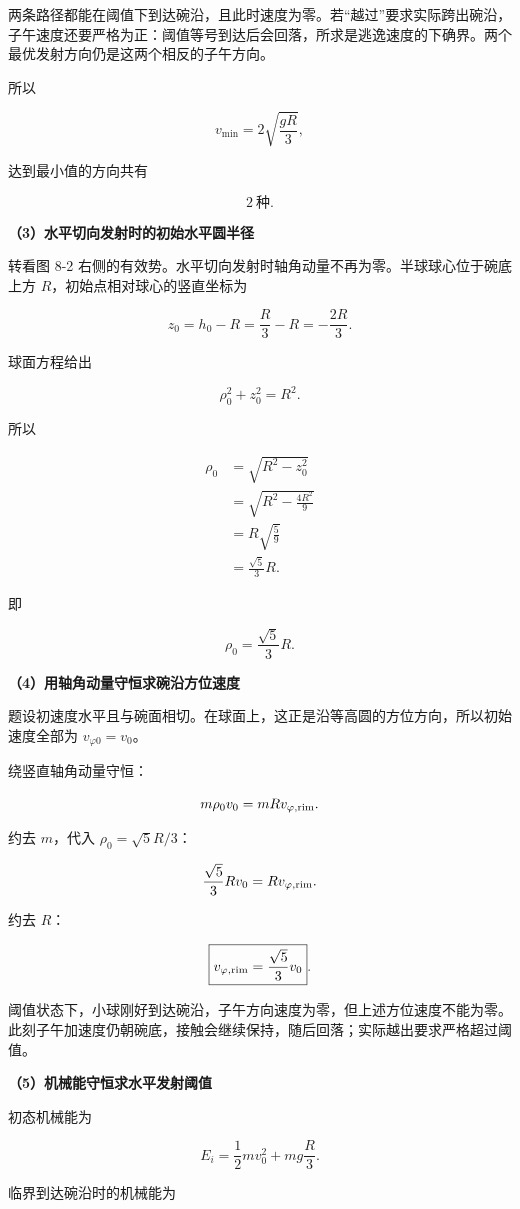 \documentclass[12pt,a4paper,UTF8]{ctexart}
\begin{document}
两条路径都能在阈值下到达碗沿，且此时速度为零。若``越过''要求实际跨出碗沿，子午速度还要严格为正：阈值等号到达后会回落，所求是逃逸速度的下确界。两个最优发射方向仍是这两个相反的子午方向。

所以

\[
\boxed{v_{\min}=2\sqrt{\frac{gR}{3}}},
\]

达到最小值的方向共有

\[\boxed{2\ \text{种}}.\]

\textbf{（3）水平切向发射时的初始水平圆半径}

转看图 8-2
右侧的有效势。水平切向发射时轴角动量不再为零。半球球心位于碗底上方
\(R\)，初始点相对球心的竖直坐标为

\[
z_0=h_0-R
=\frac R3-R
=-\frac{2R}{3}.
\]

球面方程给出

\[
\rho_0^2+z_0^2=R^2.
\]

所以

\[
\begin{aligned}
\rho_0
&=\sqrt{R^2-z_0^2}\\
&=\sqrt{R^2-\frac{4R^2}{9}}\\
&=R\sqrt{\frac59}\\
&=\frac{\sqrt5}{3}R.
\end{aligned}
\]

即

\[\boxed{\rho_0=\frac{\sqrt5}{3}R}.\]

\textbf{（4）用轴角动量守恒求碗沿方位速度}

题设初速度水平且与碗面相切。在球面上，这正是沿等高圆的方位方向，所以初始速度全部为
\(v_{\varphi0}=v_0\)。

绕竖直轴角动量守恒：

\[
m\rho_0v_0=mRv_{\varphi,\rm rim}.
\]

约去 \(m\)，代入 \(\rho_0=\sqrt5R/3\)：

\[
\frac{\sqrt5}{3}Rv_0
=Rv_{\varphi,\rm rim}.
\]

约去 \(R\)：

\[
\boxed{
v_{\varphi,\rm rim}=\frac{\sqrt5}{3}v_0
}.
\]

阈值状态下，小球刚好到达碗沿，子午方向速度为零，但上述方位速度不能为零。此刻子午加速度仍朝碗底，接触会继续保持，随后回落；实际越出要求严格超过阈值。

\textbf{（5）机械能守恒求水平发射阈值}

初态机械能为

\[
E_i=\frac12mv_0^2+mg\frac R3.
\]

临界到达碗沿时的机械能为
\end{document}

